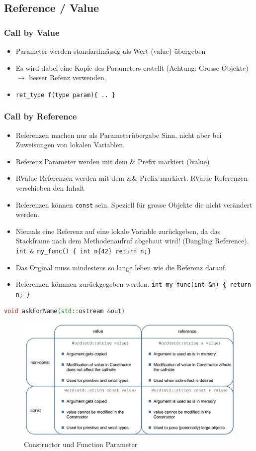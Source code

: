 \subsection{Reference / Value}
\subsubsection{Call by Value}
\begin{itemize}
	\item Parameter werden standardmässig als Wert (value) übergeben
	\item Es wird dabei eine Kopie des Parameters erstellt (Achtung: Grosse Objekte) $\rightarrow$ besser Refenz verwenden.
	\item \lstinline|ret_type f(type param){ .. }|
\end{itemize}

\subsubsection{Call by Reference}
\begin{itemize}
	\item Referenzen machen nur als Parameterübergabe Sinn, nicht aber bei Zuweisungen von lokalen Variablen.
	\item Referenz Parameter werden mit dem \& Prefix markiert (lvalue)
	\item RValue Referenzen werden mit dem \&\& Prefix markiert. RValue Referenzen verschieben den Inhalt
	\item Referenzen können \lstinline|const| sein. Speziell für grosse Objekte die nicht verändert werden.
	\item Niemals eine Referenz auf eine lokale Variable zurückgeben, da das Stackframe nach dem Methodenaufruf abgebaut wird! (Dangling Reference). \lstinline|int & my_func() { int n{42} return n;}|
	\item Das Orginal muss mindestens so lange leben wie die Referenz darauf.
	\item Referenzen könnnen zurückgegeben werden. \lstinline|int my_func(int &n) { return n; }|
\end{itemize}
\begin{lstlisting}[language=C++]
void askForName(std::ostream &out)
\end{lstlisting}

\begin{figure}[h]
\centering
\includegraphics[width=0.7\linewidth]{images/val_ref_params}
\caption{Constructor und Function Parameter}
\label{fig:valrefparams}
\end{figure}



